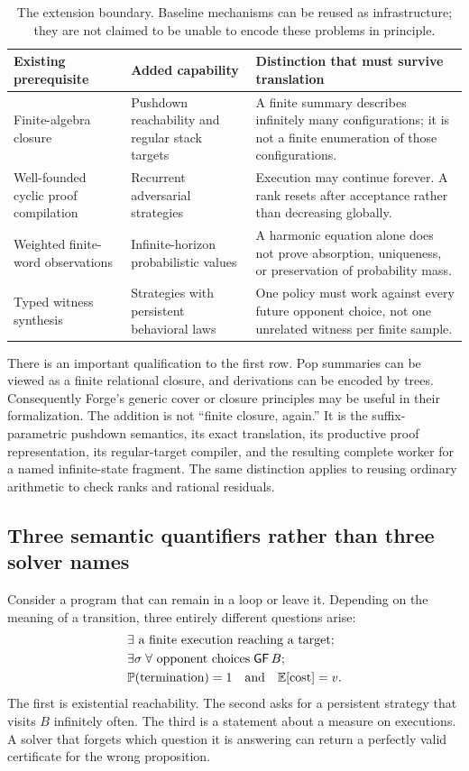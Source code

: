 \begin{table}[ht]
\centering\small
\begin{tabularx}{\textwidth}{@{}p{}XX@{}}
\toprule
Existing prerequisite & Added capability & Distinction that must survive translation \\
\midrule
Finite-algebra closure & Pushdown reachability and regular stack targets & A finite summary describes infinitely many configurations; it is not a finite enumeration of those configurations. \\
Well-founded cyclic proof compilation & Recurrent adversarial strategies & Execution may continue forever. A rank resets after acceptance rather than decreasing globally. \\
Weighted finite-word observations & Infinite-horizon probabilistic values & A harmonic equation alone does not prove absorption, uniqueness, or preservation of probability mass. \\
Typed witness synthesis & Strategies with persistent behavioral laws & One policy must work against every future opponent choice, not one unrelated witness per finite sample. \\
\bottomrule
\end{tabularx}
\caption{The extension boundary. Baseline mechanisms can be reused as infrastructure; they are not claimed to be unable to encode these problems in principle.}
\label{tab:delta}
\end{table}

There is an important qualification to the first row. Pop summaries can be
viewed as a finite relational closure, and derivations can be encoded by trees.
Consequently Forge's generic cover or closure principles may be useful in their
formalization. The addition is not ``finite closure, again.'' It is the
suffix-parametric pushdown semantics, its exact translation, its productive
proof representation, its regular-target compiler, and the resulting complete
worker for a named infinite-state fragment. The same distinction applies to
reusing ordinary arithmetic to check ranks and rational residuals.

\subsection{Three semantic quantifiers rather than three solver names}
Consider a program that can remain in a loop or leave it. Depending on the
meaning of a transition, three entirely different questions arise:
\begin{align*}
&\exists\text{ a finite execution reaching a target};\\
&\exists\sigma\;\forall\text{ opponent choices}\;\mathsf{GF}\,B;\\
&\mathbb{P}(\text{termination})=1\quad\text{and}\quad\mathbb{E}[\text{cost}]=v.
\end{align*}
The first is existential reachability. The second asks for a persistent strategy
that visits $B$ infinitely often. The third is a statement about a measure on
executions. A solver that forgets which question it is answering can return a
perfectly valid certificate for the wrong proposition.

